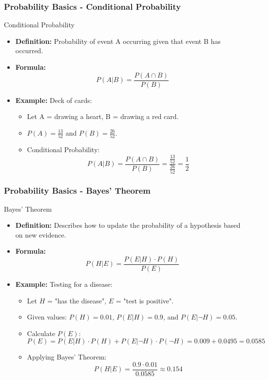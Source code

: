 \documentclass{beamer}
\begin{document}
\begin{frame}[fragile]
    \frametitle{Probability Basics - Conditional Probability}
    \begin{block}{Conditional Probability}
        \begin{itemize}
            \item \textbf{Definition:} Probability of event A occurring given that event B has occurred.
            \item \textbf{Formula:} 
            \[
            P(A|B) = \frac{P(A \cap B)}{P(B)}
            \]
            \item \textbf{Example:} Deck of cards:
            \begin{itemize}
                \item Let A = drawing a heart, B = drawing a red card.
                \item \( P(A) = \frac{13}{52} \) and \( P(B) = \frac{26}{52} \).
                \item Conditional Probability:
                \[
                P(A|B) = \frac{P(A \cap B)}{P(B)} = \frac{\frac{13}{52}}{\frac{26}{52}} = \frac{1}{2}
                \]
            \end{itemize}
        \end{itemize}
    \end{block}
\end{frame}

\begin{frame}[fragile]
    \frametitle{Probability Basics - Bayes' Theorem}
    \begin{block}{Bayes' Theorem}
        \begin{itemize}
            \item \textbf{Definition:} Describes how to update the probability of a hypothesis based on new evidence.
            \item \textbf{Formula:}
            \[
            P(H|E) = \frac{P(E|H) \cdot P(H)}{P(E)}
            \]
            \item \textbf{Example:} Testing for a disease:
            \begin{itemize}
                \item Let \( H \) = "has the disease", \( E \) = "test is positive".
                \item Given values: \( P(H) = 0.01 \), \( P(E|H) = 0.9 \), and \( P(E|\neg H) = 0.05 \).
                \item Calculate \( P(E) \):
                \[
                P(E) = P(E|H) \cdot P(H) + P(E|\neg H) \cdot P(\neg H) = 0.009 + 0.0495 = 0.0585 
                \]
                \item Applying Bayes' Theorem:
                \[
                P(H|E) = \frac{0.9 \cdot 0.01}{0.0585} \approx 0.154
                \]
            \end{itemize}
        \end{itemize}
    \end{block}
\end{frame}
\end{document}
